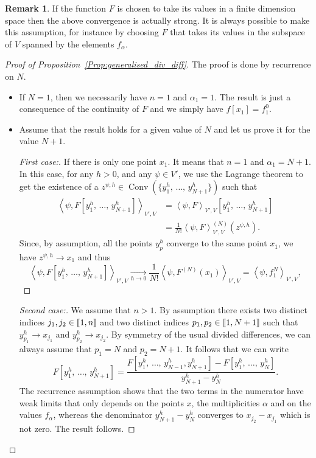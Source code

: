 \documentclass[11pt]{article}
\theoremstyle{definition}
\newtheorem{rema}[theo]{Remark}
\numberwithin{equation}{section}
\numberwithin{figure}{section}
\numberwithin{table}{section}
\DeclareMathOperator{\Conv}{Conv}
\newenvironment{step}[1]{\begin{proof}[#1]}{\let\qed\relax\end{proof}}
\newcommand{\llbracket}{\mathopen{[\mkern -2.7mu[}}
\newcommand{\rrbracket}{\mathclose{]\mkern -2.7mu]}}
\newcommand{\inter}[2]{\llbracket #1,#2 \rrbracket}
\newcommand{\dualV}[2]{\left\langle #1, #2 \right\rangle_{V',V}}
\begin{document}
\begin{rema}
If the function $F$ is chosen to take its values in a finite dimension space then the above convergence is actually strong. It is always possible to make this assumption, for instance by choosing $F$ that takes its values in the subspace of $V$ spanned by the elements $f_\alpha$.
\end{rema}

\begin{proof}[Proof of Proposition~\ref{Prop:generalised_div_diff}]
The proof is done by recurrence on $N$.
\begin{itemize}
\item If $N=1$, then we necessarily have $n=1$ and $\alpha_1=1$. The result is just a consequence of the continuity of $F$ and we simply have $f[x_1]=f_1^0$.

\item Assume that the result holds for a given value of $N$ and let us prove it for the value $N+1$.
\begin{step}{First case:}
If there is only one point $x_1$. It means that $n=1$ and $\alpha_1=N+1$. In this case, for any $h>0$, and any $\psi\in V'$, we use the Lagrange theorem to get the existence of a $z^{\psi,h}\in \Conv(\{y_1^h,\,\dotsc,\,y_{N+1}^h\})$ such that
\begin{align*}
\dualV{\psi}{F[y_1^h,\,\dotsc,\,y_{N+1}^h]} & = \dualV{\psi}{F}[y_1^h,\,\dotsc,\,y_{N+1}^h]
\\
& = \frac{1}{N!} \dualV{\psi}{F}^{(N)}(z^{\psi,h}).
\end{align*}
Since, by assumption, all the points $y_p^h$ converge to the same point $x_1$, we have $z^{\psi,h}\to x_1$ and thus
\[
\dualV{\psi}{F[y_1^h,\,\dotsc,\,y_{N+1}^h]} \xrightarrow[h\to 0]{} \frac{1}{N!} \dualV{\psi}{F^{(N)}(x_1)} = \dualV{\psi}{f_1^N},
\]
\end{step}
\begin{step}{Second case:}
We assume that $n>1$. By assumption there exists two distinct indices $j_1, j_2\in \inter{1}{n}$ and two distinct indices $p_1,p_2\in \inter{1}{N+1}$ such that $y_{p_1}^h \to x_{j_1}$ and $y_{p_2}^h\to x_{j_2}$. By symmetry of the usual divided differences, we can always assume that $p_1=N$ and $p_2=N+1$. It follows that we can write
\[
F\left[y_1^h,\,\dotsc,\,y_{N+1}^h\right] = \frac{ F\left[y_1^h,\,\dotsc,\,y_{N-1}^h,y_{N+1}^h\right] - F\left[y_1^h,\,\dotsc,\,y_{N}^h\right]}{y_{N+1}^h - y_N^h}.
\]
The recurrence assumption shows that the two terms in the numerator have weak limits that only depends on the points $x$, the multiplicities $\alpha$ and on the values $f_\alpha$, whereas the denominator $y_{N+1}^h - y_N^h$ converges to $x_{j_2}-x_{j_1}$ which is not zero. The result follows.
\end{step}
\end{itemize}
\end{proof}
\end{document}
